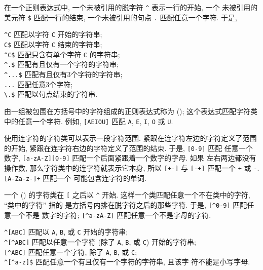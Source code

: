 在一个正则表达式中, 一个未被引用的脱字符 \verb'^' 表示一行的开始, 一个
未被引用的美元符 \verb'$' 匹配一行的结束, 一个未被引用的句点 \verb'.'
匹配任意一个字符. 于是,
\begin{tabbing}
\indent\verb'^C' \hspace{4em}  \= 匹配以字符 \verb'C' 开始的字符串; \\
\indent\verb'C$'   \> 匹配以字符 \verb'C' 结束的字符串; \\
\indent\verb'^C$'  \> 匹配只含有单个字符 \verb'C' 的字符串; \\
\indent\verb'^.$'  \> 匹配有且仅有一个字符的字符串; \\
\indent\verb'^...$' \> 匹配有且仅有3个字符的字符串; \\
\indent\verb'...'  \> 匹配任意3个字符; \\
\indent\verb'\.$'  \> 匹配以句点结束的字符串.
\end{tabbing}

由一组被包围在方括号中的字符组成的正则表达式称为 
(); 这个表达式匹配字符类中的任意一个字符. 例如,
\verb'[AEIOU]' 匹配 \verb'A', \verb'E', \verb'I', \verb'O' 或 \verb'U'.

使用连字符的字符类可以表示一段字符范围. 紧跟在连字符左边的字符定义了范围
的开始, 紧跟在连字符右边的字符定义了范围的结束. 于是, \verb'[0-9]' 匹配
任意一个数字, \verb'[a-zA-Z][0-9]' 匹配一个后面紧跟着一个数字的字母. 如果
左右两边都没有操作数, 那么字符类中的连字符就表示它本身, 所以 \verb'[+-]'
与 \verb'[-+]' 匹配一个 \verb'+' 或 \verb'-'. \verb'[A-Za-z-]+' 匹配一个
可能包含连字符的单词.

一个  () 的字符类在 \verb'[' 之后以
\verb'^' 开始. 这样一个类匹配任意一个不在类中的字符, ``类中的字符''%
指的
是方括号内排在脱字符之后的那些字符. 于是, \verb'[^0-9]' 匹配任意一个不是
数字的字符; \verb'[^a-zA-Z]' 匹配任意一个不是字母的字符.
\begin{tabbing}
    \indent\verb'^[ABC]' \hspace{4em}  \= 匹配以 \verb'A', \verb'B', 或 \verb'C'
        开始的字符串; \\
    \indent\verb'^[^ABC]' \> 匹配以任意一个字符 (除了 \verb'A', \verb'B',
        或 \verb'C') 开始的字符串; \\
    \indent\verb'[^ABC]' \> 匹配任意一个字符, 除了 \verb'A', \verb'B', 或
        \verb'C'; \\
    \indent\verb'^[^a-z]$' \> 匹配任意一个有且仅有一个字符的字符串, 且该字
        符不能是小写字母.
\end{tabbing}


